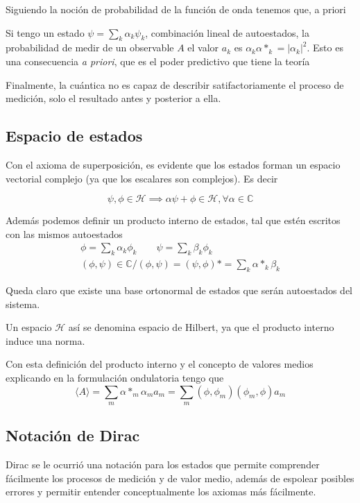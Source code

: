 Siguiendo la noción de probabilidad de la función de onda tenemos que, a priori
\begin{axiom}
    Si tengo un estado $\psi = \sum_k \alpha_k \psi_k$, combinación lineal de autoestados, la probabilidad de medir de un observable $A$ el valor $a_k$ es $\alpha_k \alpha*_k = |\alpha_k|^2$.
    Esto es una consecuencia \emph{a priori}, que es el poder predictivo que tiene la teoría
\end{axiom}

Finalmente, la cuántica no es capaz de describir satifactoriamente el proceso de medición, solo el resultado antes y posterior a ella.

\subsection{Espacio de estados}
Con el axioma de superposición, es evidente que los estados forman un espacio vectorial complejo (ya que los escalares son complejos).
Es decir

\begin{equation}
    \psi, \phi \in \mathcal{H} \implies \alpha \psi + \phi \in \mathcal{H}, \forall \alpha \in \mathbb{C}
\end{equation}

Además podemos definir un producto interno de estados, tal que estén escritos con las mismos autoestados
\begin{equation}
    \begin{gathered}
        \phi = \sum_k \alpha_k \phi_k \qquad \psi = \sum_k \beta_k \phi_k \\
        (\phi,\psi) \in \mathbb{C} / (\phi,\psi) = (\psi,\phi)* = \sum_k \alpha*_k \beta_k
    \end{gathered}
\end{equation}

Queda claro que existe una base ortonormal de estados que serán autoestados del sistema.

Un espacio $\mathcal{H}$ así se denomina espacio de Hilbert, ya que el producto interno induce una norma.

Con esta definición del producto interno y el concepto de valores medios explicando en la formulación ondulatoria tengo que
\begin{equation}
    \langle A \rangle = \sum_m \alpha*_m \alpha_m a_m = \sum_m (\phi, \phi_m) (\phi_m, \phi) a_m 
\end{equation}

\subsection{Notación de Dirac}
Dirac se le ocurrió una notación para los estados que permite comprender fácilmente los procesos de medición y de valor medio, además de espolear posibles errores y permitir entender conceptualmente los axiomas más fácilmente.

